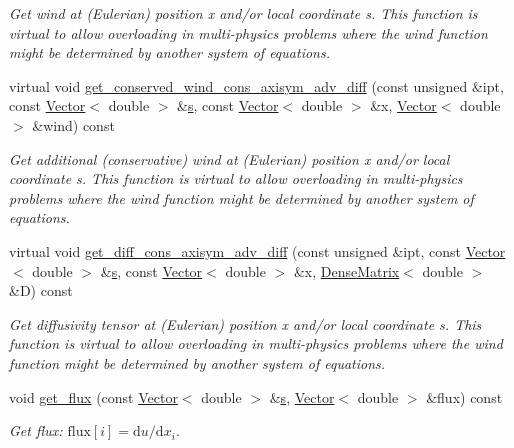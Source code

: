 \begin{DoxyCompactItemize}
\begin{DoxyCompactList}\small\item\em Get wind at (Eulerian) position x and/or local coordinate s. This function is virtual to allow overloading in multi-\/physics problems where the wind function might be determined by another system of equations. \end{DoxyCompactList}\item 
virtual void \hyperlink{namespaceoomph_a82958379ca7e57f9f8c3f273eb83f55c}{get\+\_\+conserved\+\_\+wind\+\_\+cons\+\_\+axisym\+\_\+adv\+\_\+diff} (const unsigned \&ipt, const \hyperlink{classoomph_1_1Vector}{Vector}$<$ double $>$ \&\hyperlink{cfortran_8h_ab7123126e4885ef647dd9c6e3807a21c}{s}, const \hyperlink{classoomph_1_1Vector}{Vector}$<$ double $>$ \&x, \hyperlink{classoomph_1_1Vector}{Vector}$<$ double $>$ \&wind) const
\begin{DoxyCompactList}\small\item\em Get additional (conservative) wind at (Eulerian) position x and/or local coordinate s. This function is virtual to allow overloading in multi-\/physics problems where the wind function might be determined by another system of equations. \end{DoxyCompactList}\item 
virtual void \hyperlink{namespaceoomph_a2e1c951324dd766cdaddac0eb376f78f}{get\+\_\+diff\+\_\+cons\+\_\+axisym\+\_\+adv\+\_\+diff} (const unsigned \&ipt, const \hyperlink{classoomph_1_1Vector}{Vector}$<$ double $>$ \&\hyperlink{cfortran_8h_ab7123126e4885ef647dd9c6e3807a21c}{s}, const \hyperlink{classoomph_1_1Vector}{Vector}$<$ double $>$ \&x, \hyperlink{classoomph_1_1DenseMatrix}{Dense\+Matrix}$<$ double $>$ \&D) const
\begin{DoxyCompactList}\small\item\em Get diffusivity tensor at (Eulerian) position x and/or local coordinate s. This function is virtual to allow overloading in multi-\/physics problems where the wind function might be determined by another system of equations. \end{DoxyCompactList}\item 
void \hyperlink{namespaceoomph_af24fd3b21fc45dcbe4b87f8e4224bd15}{get\+\_\+flux} (const \hyperlink{classoomph_1_1Vector}{Vector}$<$ double $>$ \&\hyperlink{cfortran_8h_ab7123126e4885ef647dd9c6e3807a21c}{s}, \hyperlink{classoomph_1_1Vector}{Vector}$<$ double $>$ \&flux) const
\begin{DoxyCompactList}\small\item\em Get flux\+: $\mbox{flux}[i] = \mbox{d}u / \mbox{d}x_i $. \end{DoxyCompactList}\item 

\end{DoxyCompactItemize}
